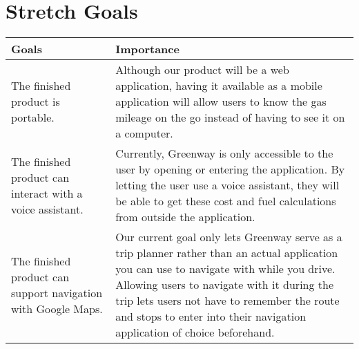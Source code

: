 \documentclass{article}
\begin{document}
\section{Stretch Goals}
    \begin{tabular}{| p{0.3\linewidth} | p{0.7\linewidth} |}
    \hline
\textbf{Goals} & \textbf{Importance}\\ \hline
The finished product is portable. & Although our product will be a web application, having it available as a mobile application will allow users to know the gas mileage on the go instead of having to see it on a computer.\\ \hline
The finished product can interact with a voice assistant. & Currently, Greenway is only accessible to the user by opening or entering the application. By letting the user use a voice assistant, they will be able to get these cost and fuel calculations from outside the application.\\ \hline 
The finished product can support navigation with Google Maps. & Our current goal only lets Greenway serve as a trip planner rather than an actual application you can use to navigate with while you drive. Allowing users to navigate with it during the trip lets users not have to remember the route and stops to enter into their navigation application of choice beforehand.\\ \hline 
\end{tabular}   
\end{document}
